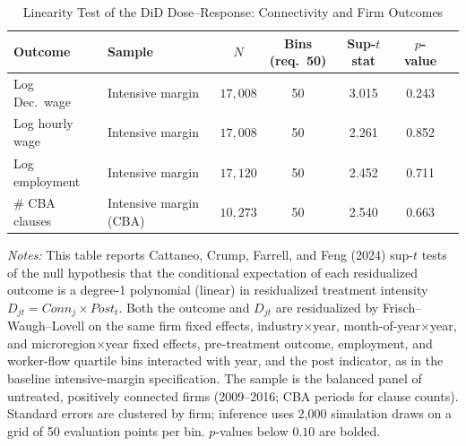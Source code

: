 \begin{table}[H]
\centering
\caption{Linearity Test of the DiD Dose--Response: Connectivity and Firm Outcomes}
\label{tab:linearity_did}
\scriptsize
\begin{tabular}{llccccc}
\toprule\toprule
Outcome & Sample & $N$ & \shortstack{Bins\\(req.\ 50)} & \shortstack{Sup-$t$\\stat} & $p$-value \\
\midrule
Log Dec.\ wage & Intensive margin & $17{,}008$ & 50 & 3.015 & 0.243 \\
Log hourly wage & Intensive margin & $17{,}008$ & 50 & 2.261 & 0.852 \\
Log employment & Intensive margin & $17{,}120$ & 50 & 2.452 & 0.711 \\
\# CBA clauses & Intensive margin (CBA) & $10{,}273$ & 50 & 2.540 & 0.663 \\
\bottomrule
\end{tabular}
\begin{minipage}{\linewidth}
\footnotesize\vspace{4pt}
\textit{Notes:} This table reports Cattaneo, Crump, Farrell, and Feng (2024) sup-$t$ tests of the null hypothesis that the conditional expectation of each residualized outcome is a degree-1 polynomial (linear) in residualized treatment intensity $D_{jt}=Conn_j\times Post_t$. Both the outcome and $D_{jt}$ are residualized by Frisch--Waugh--Lovell on the same firm fixed effects, industry$\times$year, month-of-year$\times$year, and microregion$\times$year fixed effects, pre-treatment outcome, employment, and worker-flow quartile bins interacted with year, and the post indicator, as in the baseline intensive-margin specification. The sample is the balanced panel of untreated, positively connected firms (2009--2016; CBA periods for clause counts). Standard errors are clustered by firm; inference uses 2{,}000 simulation draws on a grid of 50 evaluation points per bin. $p$-values below $0.10$ are bolded.
\end{minipage}
\end{table}
